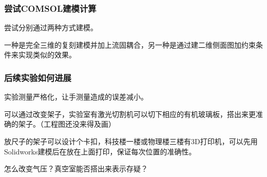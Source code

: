 \documentclass[11pt]{beamer}                                                                                               \usetheme{Boadilla}
\begin{document}
	\begin{frame}[fragile]
		\frametitle{尝试COMSOL建模计算}
		尝试分别通过两种方式建模。
		
		一种是完全三维的复刻建模并加上流固耦合，另一种是通过建二维侧面图加约束条件来实现类似的效果。
	\end{frame}
	
	\begin{frame}[fragile]
		\frametitle{后续实验如何进展}
		实验测量严格化，让手测量造成的误差减小。
		
		可以通过改变架子，实验室有激光切割机可以切下相应的有机玻璃板，搭出来更准确的架子。（工程图还没来得及画）
		
		放尺子的架子可以设计个卡扣，科技楼一楼或物理楼三楼有3D打印机，可以先用Solidworks建模后在放在上面打印，保证每次位置的准确性。
		
		怎么改变气压？真空室能否搭出来表示存疑？
		
	\end{frame}
\end{document}
